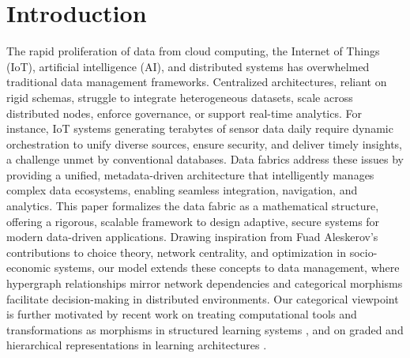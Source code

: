 \documentclass{amsart}
\begin{document}
 \maketitle


 



\section{Introduction} \label{sec-1}
The rapid proliferation of data from cloud computing, the Internet of Things (IoT), artificial intelligence (AI), and distributed systems has overwhelmed traditional data management frameworks. Centralized architectures, reliant on rigid schemas, struggle to integrate heterogeneous datasets, scale across distributed nodes, enforce governance, or support real-time analytics. For instance, IoT systems generating terabytes of sensor data daily require dynamic orchestration to unify diverse sources, ensure security, and deliver timely insights, a challenge unmet by conventional databases. Data fabrics address these issues by providing a unified, metadata-driven architecture that intelligently manages complex data ecosystems, enabling seamless integration, navigation, and analytics. This paper formalizes the data fabric as a mathematical structure, offering a rigorous, scalable framework to design adaptive, secure systems for modern data-driven applications. Drawing inspiration from Fuad Aleskerov's contributions to choice theory, network centrality, and optimization in socio-economic systems, our model extends these concepts to data management, where hypergraph relationships mirror network dependencies and categorical morphisms facilitate decision-making in distributed environments. Our categorical viewpoint is further motivated by recent work on treating computational tools and transformations as morphisms in structured learning systems \cite{sh-111}, and on graded and hierarchical representations in learning architectures \cite{sh-95, sh-89}.
\end{document}
